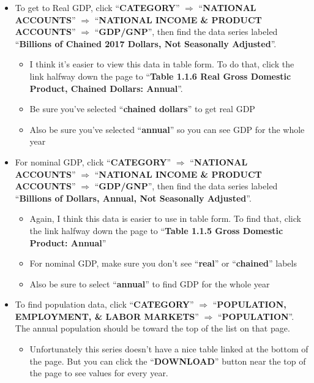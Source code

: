 \documentclass[14pt]{extarticle}
\begin{document}
\begin{Exercise}
\begin{itemize}
    \item To get to Real GDP, click ``\textbf{CATEGORY}'' $ \Rightarrow  $ ``\textbf{NATIONAL ACCOUNTS}'' $ \Rightarrow $ ``\textbf{NATIONAL INCOME \& PRODUCT ACCOUNTS}'' $ \Rightarrow $ ``\textbf{GDP/GNP}'', then find the data series labeled ``\textbf{Billions of Chained 2017 Dollars, Not Seasonally Adjusted}''.
    \begin{itemize}
        \item I think it's easier to view this data in table form. To do that, click the link halfway down the page to ``\textbf{Table 1.1.6 Real Gross Domestic Product, Chained Dollars: Annual}''.
        \item Be sure you’ve selected ``\textbf{chained dollars}'' to get real GDP
        \item Also be sure you’ve selected ``\textbf{annual}'' so you can see GDP for the whole year
    \end{itemize}
    \item For nominal GDP, click ``\textbf{CATEGORY}'' $ \Rightarrow $ ``\textbf{NATIONAL ACCOUNTS}'' $ \Rightarrow $ ``\textbf{NATIONAL INCOME \& PRODUCT ACCOUNTS}'' $ \Rightarrow $ ``\textbf{GDP/GNP}'', then find the data series labeled ``\textbf{Billions of Dollars, Annual, Not Seasonally Adjusted}''.
    \begin{itemize}
        \item Again, I think this data is easier to use in table form. To find that, click the link halfway down the page to ``\textbf{Table 1.1.5 Gross Domestic Product: Annual}''
        \item For nominal GDP, make sure you don’t see ``\textbf{real}'' or ``\textbf{chained}'' labels
        \item Also be sure to select ``\textbf{annual}'' to find GDP for the whole year
    \end{itemize}
    \item To find population data, click ``\textbf{CATEGORY}'' $ \Rightarrow $ ``\textbf{POPULATION, EMPLOYMENT, \& LABOR MARKETS}'' $ \Rightarrow $ ``\textbf{POPULATION}''. The annual population should be toward the top of the list on that page.
    \begin{itemize}
        \item Unfortunately this series doesn’t have a nice table linked at the bottom of the page. But you can click the ``\textbf{DOWNLOAD}'' button near the top of the page to see values for every year.
    \end{itemize}
\end{itemize}


\end{Exercise}
\end{document}
